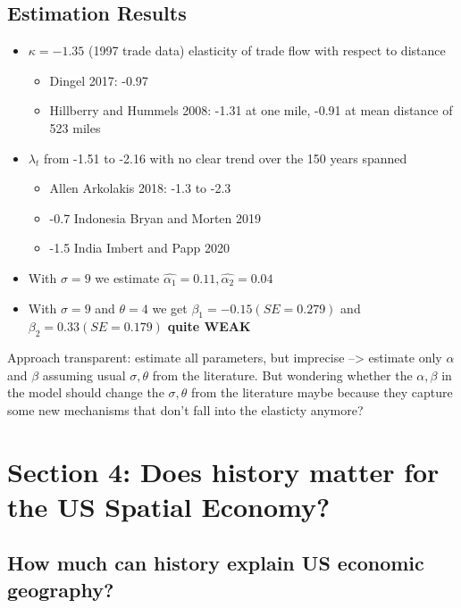\documentclass[10pt, final]{article}
\begin{document}
\subsection{Estimation Results} %
\label{sub:estimation_results}
\begin{itemize}
    \item $\kappa = -1.35$ (1997 trade data) elasticity of trade flow with respect to distance
    \begin{itemize}
         \item Dingel 2017: -0.97
         \item Hillberry and Hummels 2008: -1.31 at one mile, -0.91 at mean distance of 523 miles
     \end{itemize}
     \item $\lambda_t$ from -1.51 to -2.16 with no clear trend over the 150 years spanned
     \begin{itemize}
          \item Allen Arkolakis 2018: -1.3 to -2.3
          \item -0.7 Indonesia Bryan and Morten 2019
          \item -1.5 India Imbert and Papp 2020
      \end{itemize} 
      \item With $\sigma=9$ we estimate $\hat{\alpha_1} = 0.11, \hat{\alpha_2} = 0.04$
      \item With $\sigma=9$ and $\theta=4$ we get $\beta_1 = -0.15 (SE=0.279)$ and $\beta_2  = 0.33 (SE=0.179)$ \textbf{quite WEAK}
\end{itemize}
Approach transparent: estimate all parameters, but imprecise --> estimate only $\alpha$ and $\beta$ assuming usual $\sigma, \theta$ from the literature. But wondering whether the $\alpha, \beta$ in the model should change the $\sigma, \theta$ from the literature maybe because they capture some new mechanisms that don't fall into the elasticty anymore?
\\


  


\section*{Section 4: Does history matter for the US Spatial Economy?} %
\label{sec:section_4_does_history_matter_for_the_us_spatial_economy_}


\subsection*{How much can history explain US economic geography?} %
\label{sub:how_much_can_history_explain_us_economic_geography_}
\end{document}
